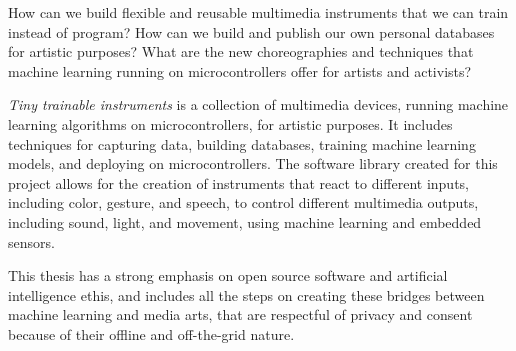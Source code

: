 % 
%
%
How can we build flexible and reusable multimedia instruments that we can train instead of program? How can we build and publish our own personal databases for artistic purposes? What are the new choreographies and techniques that machine learning running on microcontrollers offer for artists and activists?

 \emph{Tiny trainable instruments} is a collection of multimedia devices, running machine learning algorithms on microcontrollers, for artistic purposes. It includes techniques for capturing data, building databases, training machine learning models, and deploying on microcontrollers. The software library created for this project allows for the creation of instruments that react to different inputs, including color, gesture, and speech, to control different multimedia outputs, including sound, light, and movement, using machine learning and embedded sensors.

This thesis has a strong emphasis on open source software and artificial intelligence ethis, and includes all the steps on creating these bridges between machine learning and media arts, that are respectful of privacy and consent because of their offline and off-the-grid nature.
